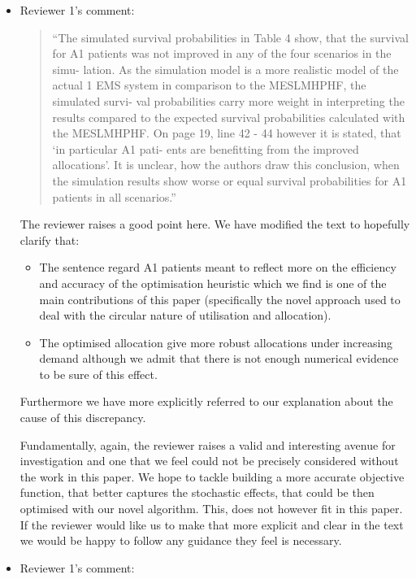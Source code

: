 \documentclass{article}
\begin{document}
\begin{itemize}
\item Reviewer 1's comment:

\begin{quote}
``The simulated survival probabilities in Table 4 show, that the survival for
A1 patients was not improved in any of the four scenarios in the simu-
lation. As the simulation model is a more realistic model of the actual
1
EMS system in comparison to the MESLMHPHF, the simulated survi-
val probabilities carry more weight in interpreting the results compared
to the expected survival probabilities calculated with the MESLMHPHF.
On page 19, line 42 - 44 however it is stated, that ‘in particular A1 pati-
ents are benefitting from the improved allocations’. It is unclear, how the
authors draw this conclusion, when the simulation results show worse or
equal survival probabilities for A1 patients in all scenarios.''
\end{quote}

The reviewer raises a good point here. We have modified the text to hopefully
clarify that:

\begin{itemize}
    \item The sentence regard A1 patients meant to reflect more on the
        efficiency and accuracy of the optimisation heuristic which we find is
        one of the main contributions of this paper (specifically the novel
        approach used to deal with the circular nature of utilisation and
        allocation).
    \item The optimised allocation give more robust allocations under increasing
        demand although we admit that there is not enough numerical evidence to
        be sure of this effect.
\end{itemize}

Furthermore we have more explicitly referred to our explanation about the cause
of this discrepancy.

Fundamentally, again, the reviewer raises a valid and interesting avenue for investigation and
one that we feel
could not be precisely considered without the work in this paper. We hope to
tackle building a more accurate objective function, that better captures the
stochastic effects, that could be then optimised with our novel algorithm. This,
does not however fit in this paper. If the reviewer would like us to make that
more explicit and clear in the text we would be happy to follow any guidance
they feel is necessary.

\item Reviewer 1's comment:


\end{itemize}
\end{document}
